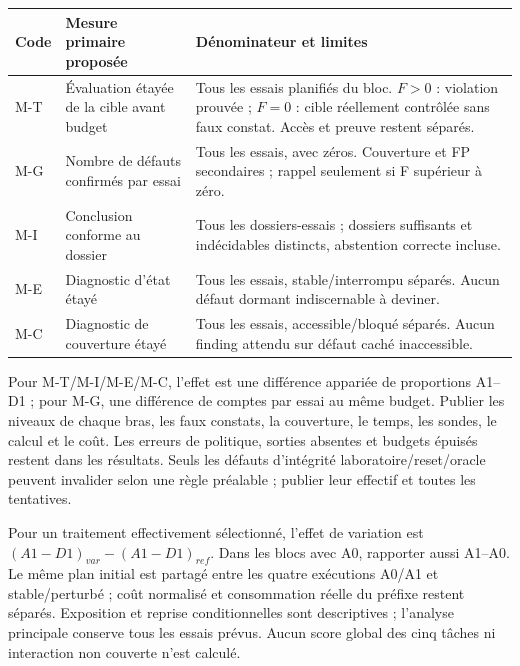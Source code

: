 \documentclass[11pt,a4paper]{article}
\begin{document}
\begin{tabularx}{\textwidth}{@{}P{13mm}P{37mm}Y@{}}\toprule
Code & Mesure primaire proposée & Dénominateur et limites\\\midrule
M-T & Évaluation étayée de la cible avant budget & Tous les essais planifiés du bloc. $F>0$ : violation prouvée ; $F=0$ : cible réellement contrôlée sans faux constat. Accès et preuve restent séparés.\\
M-G & Nombre de défauts confirmés par essai & Tous les essais, avec zéros. Couverture et FP secondaires ; rappel seulement si F supérieur à zéro.\\
M-I & Conclusion conforme au dossier & Tous les dossiers-essais ; dossiers suffisants et indécidables distincts, abstention correcte incluse.\\
M-E & Diagnostic d'état étayé & Tous les essais, stable/interrompu séparés. Aucun défaut dormant indiscernable à deviner.\\
M-C & Diagnostic de couverture étayé & Tous les essais, accessible/bloqué séparés. Aucun finding attendu sur défaut caché inaccessible.\\\bottomrule
\end{tabularx}

Pour M-T/M-I/M-E/M-C, l'effet est une différence appariée de proportions A1--D1 ; pour M-G, une différence de comptes par essai au même budget. Publier les niveaux de chaque bras, les faux constats, la couverture, le temps, les sondes, le calcul et le coût. Les erreurs de politique, sorties absentes et budgets épuisés restent dans les résultats. Seuls les défauts d'intégrité laboratoire/reset/oracle peuvent invalider selon une règle préalable ; publier leur effectif et toutes les tentatives.

Pour un traitement effectivement sélectionné, l'effet de variation est $(A1-D1)_{var}-(A1-D1)_{ref}$. Dans les blocs avec A0, rapporter aussi A1--A0. Le même plan initial est partagé entre les quatre exécutions A0/A1 et stable/perturbé ; coût normalisé et consommation réelle du préfixe restent séparés. Exposition et reprise conditionnelles sont descriptives ; l'analyse principale conserve tous les essais prévus. Aucun score global des cinq tâches ni interaction non couverte n'est calculé.

\label{sec:measures}
\end{document}
